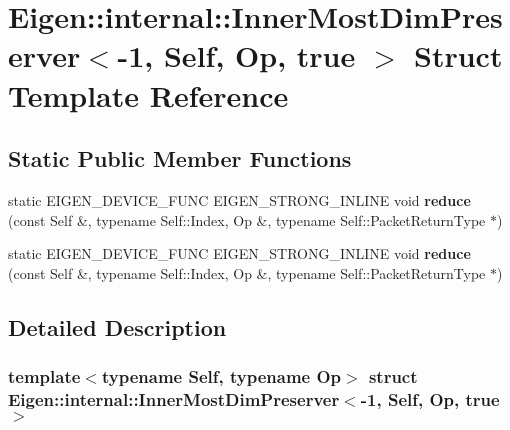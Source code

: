 \hypertarget{struct_eigen_1_1internal_1_1_inner_most_dim_preserver_3-1_00_01_self_00_01_op_00_01true_01_4}{}\section{Eigen\+:\+:internal\+:\+:Inner\+Most\+Dim\+Preserver$<$-\/1, Self, Op, true $>$ Struct Template Reference}
\label{struct_eigen_1_1internal_1_1_inner_most_dim_preserver_3-1_00_01_self_00_01_op_00_01true_01_4}
\subsection*{Static Public Member Functions}
\begin{DoxyCompactItemize}
\item 
\mbox{\label{struct_eigen_1_1internal_1_1_inner_most_dim_preserver_3-1_00_01_self_00_01_op_00_01true_01_4_aadae7e1e82693167ef28419bee3214ef}} 
static E\+I\+G\+E\+N\+\_\+\+D\+E\+V\+I\+C\+E\+\_\+\+F\+U\+NC E\+I\+G\+E\+N\+\_\+\+S\+T\+R\+O\+N\+G\+\_\+\+I\+N\+L\+I\+NE void {\bfseries reduce} (const Self \&, typename Self\+::\+Index, Op \&, typename Self\+::\+Packet\+Return\+Type $\ast$)
\item 
\mbox{\label{struct_eigen_1_1internal_1_1_inner_most_dim_preserver_3-1_00_01_self_00_01_op_00_01true_01_4_aadae7e1e82693167ef28419bee3214ef}} 
static E\+I\+G\+E\+N\+\_\+\+D\+E\+V\+I\+C\+E\+\_\+\+F\+U\+NC E\+I\+G\+E\+N\+\_\+\+S\+T\+R\+O\+N\+G\+\_\+\+I\+N\+L\+I\+NE void {\bfseries reduce} (const Self \&, typename Self\+::\+Index, Op \&, typename Self\+::\+Packet\+Return\+Type $\ast$)
\end{DoxyCompactItemize}


\subsection{Detailed Description}
\subsubsection*{template$<$typename Self, typename Op$>$\newline
struct Eigen\+::internal\+::\+Inner\+Most\+Dim\+Preserver$<$-\/1, Self, Op, true $>$}



